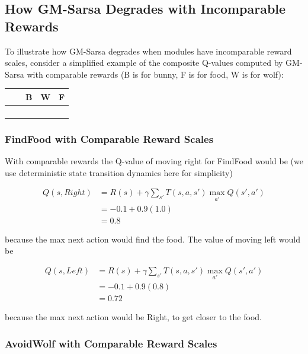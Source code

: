 \subsection{How GM-Sarsa Degrades with Incomparable Rewards}

To illustrate how GM-Sarsa degrades when modules have incomparable reward scales, consider a simplified example of the composite Q-values computed by GM-Sarsa with comparable rewards (B is for bunny, F is for food, W is for wolf):

\begin{center}
\begin{tabular}{|p{1em}|p{1em}|p{1em}|p{1em}|p{1em}|}\hline
  &   & B & W & F \\\hline
  &   &   &   &   \\\hline
  &   &   &   &   \\\hline
  &   &   &   &   \\\hline
  &   &   &   &   \\\hline
\end{tabular}
\end{center}

\subsubsection{FindFood with Comparable Reward Scales}

With comparable rewards the Q-value of moving right for FindFood would be (we use deterministic state transition dynamics here for simplicity)

\begin{align*}
Q(s, Right) &= R(s) + \gamma \sum_{s'} T(s, a, s') \max_{a'} Q(s', a')\\
              &= -0.1 + 0.9 (1.0)\\
              &= 0.8
\end{align*}

because the max next action would find the food. The value of moving left would be

\begin{align*}
Q(s, Left) &= R(s) + \gamma \sum_{s'} T(s, a, s') \max_{a'} Q(s', a')\\
             &= -0.1 + 0.9 (0.8)\\
             &= 0.72
\end{align*}

because the max next action would be Right, to get closer to the food.

\subsubsection{AvoidWolf with Comparable Reward Scales}

